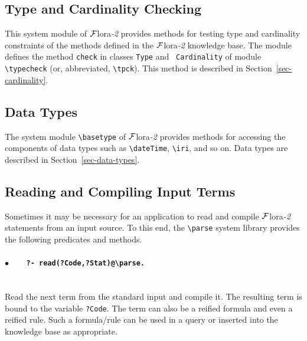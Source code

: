 \documentclass[11pt]{article}
\newcommand{\FLORA}{{\mbox{\sc ${\cal F}${lora}\rm\emph{-2}}}\xspace}
\newcommand{\FLSYSTEM}{\FLORA}
\newcommand{\bs}{\textbackslash}
\begin{document}
\subsection{Type and Cardinality Checking}\label{sec-type-sysmod}

This system module of \FLSYSTEM provides methods for testing type and
cardinality
constraints of the methods defined in the \FLSYSTEM knowledge base.  The
module defines the method {\tt check} in classes \texttt{Type} and  {\tt
  Cardinality} of module {\tt \bs{}typecheck} (or, abbreviated,
\texttt{\bs{}tpck}).  This method is described in
Section~\ref{sec-cardinality}.

\subsection{Data Types}\label{sec-data-types-sysmod}

The system module \texttt{\bs{}basetype}   of \FLSYSTEM provides methods for accessing the components
of data types such as {\tt \bs{}dateTime}, {\tt \bs{}iri}, and so on.
Data types are described in Section~\ref{sec-data-types}.

\subsection{Reading and Compiling Input Terms}\label{sec-parse-compile}

Sometimes it may be necessary for an application to read and compile \FLSYSTEM
statements from an input source. To this end, the {\tt \bs{}parse} 
system library provides the following predicates and methods.
\paragraph{$\bullet$~~~ \tt ?- read(?Code,?Stat)@\bs{}parse.} ~~\\
Read the next term from the standard input and compile it. The resulting
term is bound to the variable {\tt ?Code}.  The term can also be a reified
formula and even a reified rule.  Such a formula/rule can be used in a
query or inserted into the knowledge base as appropriate.
\end{document}
